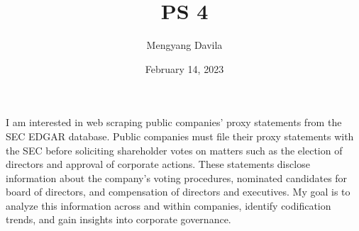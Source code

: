 \documentclass{article}
\title{PS 4}
\author{Mengyang Davila}
\date{February 14, 2023}
\begin{document}
\maketitle
I am interested in web scraping public companies' proxy statements from the SEC EDGAR database. Public companies must file their proxy statements with the SEC before soliciting shareholder votes on matters such as the election of directors and approval of corporate actions. These statements disclose information about the company's voting procedures, nominated candidates for board of directors, and compensation of directors and executives. My goal is to analyze this information across and within companies, identify codification trends, and gain insights into corporate governance.
\end{document}
